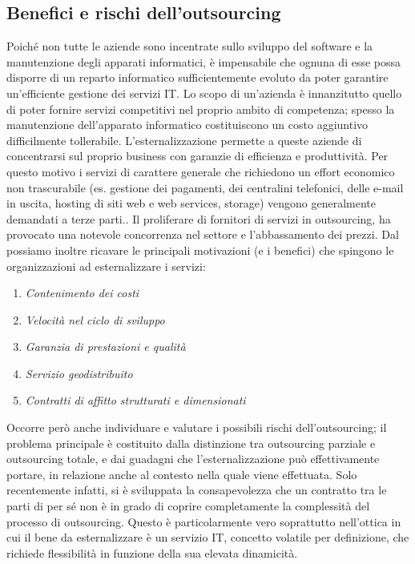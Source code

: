 \subsection{Benefici e rischi dell'outsourcing}
Poiché non tutte le aziende sono incentrate sullo sviluppo del software e la manutenzione degli apparati informatici, è impensabile che ognuna di esse possa disporre di un reparto informatico sufficientemente evoluto da poter garantire un'efficiente gestione dei servizi IT.
Lo scopo di un'azienda è innanzitutto quello di poter fornire servizi competitivi nel proprio ambito di competenza; spesso la  manutenzione dell'apparato informatico costituiscono un costo aggiuntivo difficilmente tollerabile.
L'esternalizzazione permette a queste aziende di concentrarsi sul proprio business con garanzie di efficienza e produttività.
Per questo motivo i servizi di carattere generale che richiedono un effort economico non trascurabile (es. gestione dei pagamenti, dei centralini telefonici, delle e-mail in uscita, hosting di siti web e web services, storage) vengono generalmente demandati a terze parti.\cite{OutsourcingCloud}.
Il proliferare di fornitori di servizi in outsourcing, ha provocato una notevole concorrenza nel settore e l'abbassamento dei prezzi.
Dal \cite{OutsourcingCloud} possiamo inoltre ricavare le principali motivazioni (e i benefici) che spingono le organizzazioni ad esternalizzare i servizi:
\begin{enumerate}
\item \textit{Contenimento dei costi}
\item \textit{Velocità nel ciclo di sviluppo}
\item \textit{Garanzia di prestazioni e qualità}
\item \textit{Servizio geodistribuito}
\item \textit{Contratti di affitto strutturati e dimensionati}
\end{enumerate}
Occorre però anche individuare e valutare i possibili rischi dell'outsourcing; il problema principale è costituito dalla distinzione tra outsourcing parziale e outsourcing totale, e dai guadagni che l'esternalizzazione può effettivamente portare, in relazione anche al contesto nella quale viene effettuata.
Solo recentemente infatti, si è sviluppata la consapevolezza che un contratto tra le parti di per sé non è in grado di coprire completamente la complessità del processo di outsourcing. Questo è particolarmente vero soprattutto nell'ottica in cui il bene da esternalizzare è un servizio IT, concetto volatile per definizione, che richiede flessibilità in funzione della sua elevata dinamicità.\cite{OutsourcingCloud2}


